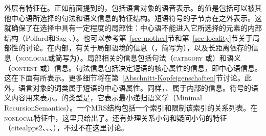 \z
外层有特征\phon 在\synsem 。正如前面提到的，\phon 包括语言对象的语音表示。\synsem 的值是包括可以被其他中心语所选择的句法和语义信息的特征结构。短语符号的子节点在\synsem 之外表示。这就确保了在选择中具有一定程度的局部性：中心语不能进入它所选择的元素的内部结构（Pollard和Sag \citeyear[--145]{ps}、\citeyear[]{ps2}）。也可以参考第~\ref{sec-mother}节和第~\ref{sec-locality}节关于局部性的讨论。在\synsem 内部，有关于局部语境的信息（\local ，简写为\loc ），以及长距离依存的信息（\textsc{nonlocal}或简写为\nonloc ）。局部相关的信息包括句法（\textsc{category} 或\cat ）和语义（\textsc{content} 或\cont ）信息。句法信息包括决定短语的核心属性的信息，即中心语信息。这在\head 下面有所表示。更多细节将在第~\ref{Abschnitt-Kopfeigenschaften}节讨论。此外，语言对象的词类属于短语的中心语属性。同样，\head 、\subcat 属于\cat 内部的信息。符号的语义内容用\cont 来表示。\contv 的类型是，它表示最小递归语义学（Minimal RecursionSemantics）\indexmrs \citep*{CFPS2005a}。一个MRS结构包括一个索引和限制该索引的关系列表。在\textsc{nonlocal}特征中，这里只给出了\slasch 。还有处理关系小句和疑问小句的特征（citealp{ps2}、\citealp{Sag97a}、\citealp{GSag2000a-u}、\citealp{Holler2005a-u}），不过不在这里讨论。

